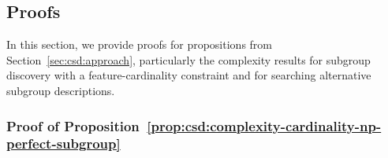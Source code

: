 \documentclass{article}
\theoremstyle{definition}
\begin{document}
\subsection{Proofs}
\label{sec:csd:appendix:proofs}

In this section, we provide proofs for propositions from Section~\ref{sec:csd:approach}, particularly the complexity results for subgroup discovery with a feature-cardinality constraint and for searching alternative subgroup descriptions.

\subsubsection{Proof of Proposition~\ref{prop:csd:complexity-cardinality-np-perfect-subgroup}}
\label{sec:csd:appendix:proofs:complexity-cardinality-np-perfect-subgroup}
\end{document}

